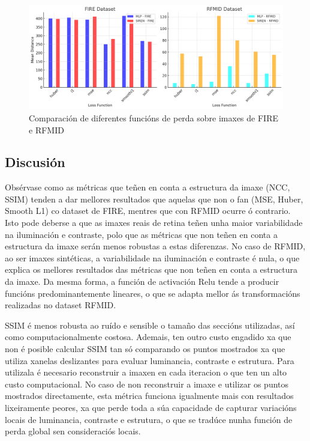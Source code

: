 \begin{figure}[tbp]
    \centering
    \includegraphics[width=1\textwidth]{imaxes/losstype.png}
    \caption{Comparación de diferentes funcións de perda sobre imaxes de FIRE e RFMID}
    \label{fig:loss_functions_comparison}
\end{figure}

\subsection{Discusión}
\label{subsec:Discusion-loss}

Obsérvase como as métricas que teñen en conta a estructura da imaxe (NCC, SSIM) tenden a dar mellores resultados que aquelas que non o fan (MSE, Huber, Smooth L1) co dataset de FIRE, mentres que con RFMID ocurre ó contrario.
Isto pode deberse a que as imaxes reais de retina teñen unha maior variabilidade na iluminación e contraste, polo que as métricas que non teñen en conta a estructura da imaxe serán menos robustas a estas diferenzas.
No caso de RFMID, ao ser imaxes sintéticas, a variabilidade na iluminación e contraste é nula, o que explica os mellores resultados das métricas que non teñen en conta a estructura da imaxe.
Da mesma forma, a función de activación Relu tende a producir funcións predominantemente lineares, o que se adapta mellor ás transformacións realizadas no dataset RFMID.

SSIM é menos robusta ao ruído e sensible o tamaño das seccións utilizadas, así como computacionalmente costosa. Ademais, ten outro custo engadido xa que non é posible calcular SSIM tan só comparando os puntos mostrados xa que utiliza xanelas deslizantes para evaluar luminancia, contraste e estrutura. 
Para utilizala é necesario reconstruir a imaxen en cada iteracion o que ten un alto custo computacional.
No caso de non reconstruir a imaxe e utilizar os puntos mostrados directamente, esta métrica funciona igualmente mais con resultados lixeiramente peores, xa que perde toda a súa capacidade de capturar variacións locais de luminancia, contraste e estrutura, o que se tradúce nunha función de perda global sen consideraciós locais.

